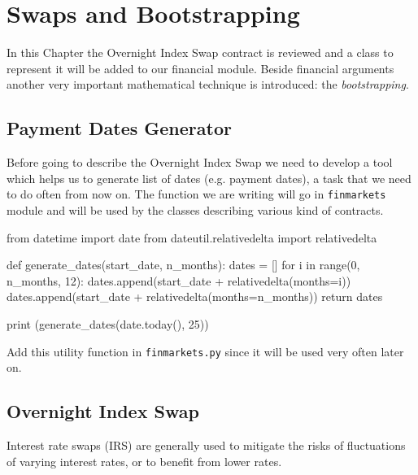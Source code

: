 \chapter{Swaps and Bootstrapping}\label{sec:swaps-and-bootstrapping}

In this Chapter the Overnight Index Swap contract is reviewed and a class to represent it will be added to our financial module. Beside financial arguments another very important mathematical technique is introduced: the \emph{bootstrapping}.

\section{Payment Dates Generator}
Before going to describe the Overnight Index Swap we need to develop a tool which helps us to generate list of dates (e.g. payment dates), a task that we need to do often from now on. 
The function we are writing will go in \texttt{finmarkets} module and will be used by the classes describing various kind of contracts.

\begin{ipython}
from datetime import date
from dateutil.relativedelta import relativedelta

def generate_dates(start_date, n_months):
    dates = []
    for i in range(0, n_months, 12):
        dates.append(start_date + relativedelta(months=i))
    dates.append(start_date + relativedelta(months=n_months))
    return dates

print (generate_dates(date.today(), 25))
\end{ipython}
\begin{ioutput}
\end{ioutput}

\begin{finmarkets}
Add this utility function in \texttt{finmarkets.py} since it will be used very often later on.
\end{finmarkets}

\section{Overnight Index Swap}\label{overnight-index-swap}

Interest rate swaps (IRS) are generally used to mitigate the risks of fluctuations of varying interest rates, or to benefit from lower rates.

